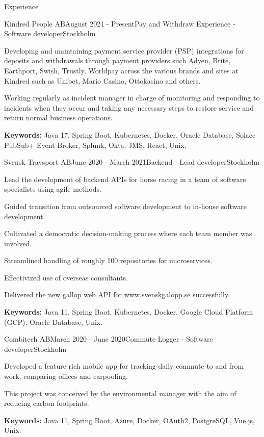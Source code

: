 \documentclass{resume}
\begin{document}
  \begin{rSection}{Experience}
      \begin{rSubsection}{Kindred People AB}{August 2021 - Present}{Pay and Withdraw Experience - Software developer}{Stockholm}
      \item Developing and maintaining payment service provider (PSP) integrations for deposits and withdrawals through payment providers such Adyen, Brite, Earthport, Swish, Trustly, Worldpay across the various brands and sites at Kindred such as Unibet, Mario Casino, Ottokasino and others. 
      \item Working regularly as incident manager in charge of monitoring and responding to incidents when they occur and taking any necessary steps to restore service and return normal business operations.
      \item \textbf{Keywords:} Java 17, Spring Boot, Kubernetes, Docker, Oracle Database, Solace PubSub+ Event Broker, Splunk, Okta, JMS, React, Unix.
    \end{rSubsection}
    
    \begin{rSubsection}{Svensk Travsport AB}{June 2020 - March 2021}{Backend - Lead developer}{Stockholm}
      \item Lead the development of backend APIs for horse racing in a team of software specialists using agile methods.
      \item Guided transition from outsourced software development to in-house software development.
      \item Cultivated a democratic decision-making process where each team member was involved.
      \item Streamlined handling of roughly 100 repositories for microservices.
      \item Effectivized use of overseas consultants.
      \item Delivered the new gallop web API for www.svenskgalopp.se successfully.
      \item \textbf{Keywords:} Java 11, Spring Boot, Kubernetes, Docker, Google Cloud Platform (GCP), Oracle Database, Unix.
    \end{rSubsection}

    \begin{rSubsection}{Combitech AB}{March 2020 - June 2020}{Commute Logger - Software developer}{Stockholm}
      \item Developed a feature-rich mobile app for tracking daily commute to and from work, comparing offices and carpooling.
      \item This project was conceived by the environmental manager with the aim of reducing carbon footprints.
      \item \textbf{Keywords:} Java 11, Spring Boot, Azure, Docker, OAuth2, PostgreSQL, Vue.js, Unix.
    \end{rSubsection}


\end{rSection}
\end{document}
